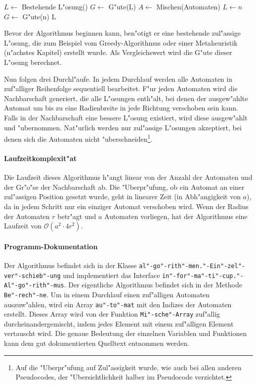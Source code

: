 \begin{algorithmic}
\STATE $L \gets$ Bestehende L"osung()
\STATE $G \gets$ G"ute(L)
	\STATE $A \gets$ Mischen(Automaten)
				\STATE $L \gets n$
				\STATE $G \gets$ G"ute(n)
			\ENDIF
		\ENDFOR
	\ENDFOR
\ENDFOR
\RETURN L
\end{algorithmic}
Bevor der Algorithmus beginnen kann, ben"otigt er eine bestehende zul"assige L"osung, die zum Beispiel vom Greedy-Algorithmus oder einer Metaheuristik (n"achstes Kapitel) erstellt wurde. Als Vergleichswert wird die G"ute dieser L"osung berechnet. 

Nun folgen drei Durchl"aufe. In jedem Durchlauf werden alle Automaten in zuf"alliger Reihenfolge sequentiell bearbeitet. F"ur jeden Automaten wird die Nachbarschaft generiert, die alle L"osungen enth"alt, bei denen der ausgew"ahlte Automat um bis zu eine Radienbreite in jede Richtung verschoben sein kann. Falls in der Nachbarschaft eine bessere L"osung existiert, wird diese ausgew"ahlt und "ubernommen. Nat"urlich werden nur zul"assige L"osungen akzeptiert, bei denen sich die Automaten nicht "uberschneiden\footnote{Auf die "Uberpr"ufung auf Zul"assigkeit wurde, wie auch bei allen anderen Pseudocodes, der "Ubersichtlichkeit halber im Pseudocode verzichtet.}.

\paragraph{Laufzeitkomplexit"at}
Die Laufzeit dieses Algorithmus h"angt linear von der Anzahl der Automaten und der Gr"o"se der Nachbarschaft ab. Die "Uberpr"ufung, ob ein Automat an einer zul"assigen Position gesetzt wurde, geht in linearer Zeit (in Abh"angigkeit von \(a\)), da in jedem Schritt nur ein einziger Automat verschoben wird. Wenn der Radius der Automaten \(r\) betr"agt und \(a\) Automaten vorliegen, hat der Algorithmus eine Laufzeit von \(\mathcal{O}(a^2 \cdot 4r^2)\).

\paragraph{Programm-Dokumentation}
Der Algorithmus befindet sich in der Klasse \texttt{al"-go"-rith"-men."-Ein"-zel"-ver"-schieb"-ung} und implementiert das Interface \texttt{in"-for"-ma"-ti"-cup."-Al"-go"-rith"-mus}. Der eigentliche Algorithmus befindet sich in der Methode \texttt{Be"-rech"-ne}. Um in einem Durchlauf einen zuf"alligen Automaten auszuw"ahlen, wird ein Array \texttt{au"-to"-mat} mit den Indizes der Automaten erstellt. Dieses Array wird von der Funktion \texttt{Mi"-sche"-Array} zuf"allig durcheinandergemischt, indem jedes Element mit einem zuf"alligen Element vertauscht wird. Die genaue Bedeutung der einzelnen Variablen und Funktionen kann dem gut dokumentierten Quelltext entnommen werden. 

